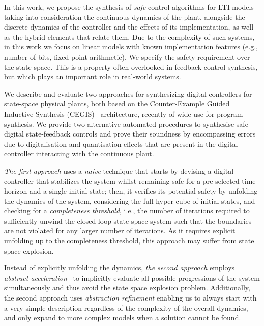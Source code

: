 \documentclass[runningheads,a4paper]{llncs}
\begin{document}
In this work, we propose the synthesis of \emph{safe} control algorithms for
LTI models taking into consideration the continuous dynamics of the plant, 
alongside the discrete dynamics of the controller and the effects of its 
implementation, as well as the hybrid elements that relate them.  
Due to the complexity of such systems, in this work we focus 
on linear models with known  implementation features (e.g., number of bits, fixed-point
arithmetic). We specify the safety requirement over the state space. This is a property often 
overlooked in feedback control synthesis, but which plays an important role 
in real-world systems.

We describe and evaluate two approaches for synthesizing digital controllers for state-space physical plants, 
both based on the Counter-Example Guided Inductive Synthesis (CEGIS)~\cite{sketch} architecture, recently of wide use for program synthesis.   
We provide two alternative automated procedures to synthesise safe 
digital state-feedback controls
and prove their soundness by encompassing errors due to digitalisation and quantisation effects that are present in the digital controller interacting with the continuous plant. 

{\em The first approach} uses a {\em naive}
technique that starts by devising a digital controller that stabilizes the system
whilst remaining safe for a 
pre-selected time horizon and a single initial state; then, it verifies its potential safety by unfolding
the dynamics of the system, considering the full hyper-cube of initial states, and checking for a {\em completeness threshold}, i.e.,
the number of iterations required to sufficiently unwind
the closed-loop state-space system such
that the boundaries are not violated for any larger number of iterations.
As it requires explicit unfolding up to the completeness
threshold, this approach may suffer from state space explosion.

Instead of explicitly unfolding the dynamics, {\em the second approach} 
employs {\em abstract acceleration}~\cite{cattaruzza2015unbounded} to implicitly
evaluate all possible progressions of the system simultaneously and thus avoid
the state space explosion problem.
Additionally, the second approach uses
{\em abstraction refinement} enabling us to always start with a very simple description
regardless of the complexity of the overall dynamics, and only expand to more
complex models when a solution cannot be found.
\end{document}
